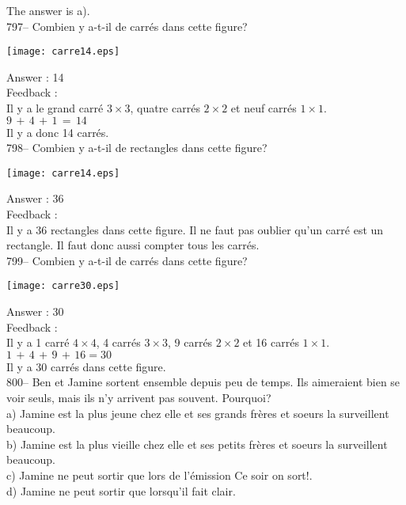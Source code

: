 ﻿\documentclass[letterpaper, 12pt]{article}
\begin{document}
The answer is a).\\

797-- Combien y a-t-il de carr\'es dans cette figure?\\
    \begin{center}
    \texttt{[image: carre14.eps]}
    \end{center}


Answer : 14\\

Feedback : \\
Il y a le grand carr\'e $3\times3$, quatre carr\'es $2\times2$ et neuf
carr\'es $1\times1$.\\
$9\,+\,4\,+\,1\,=\,14$\\
Il y a donc 14 carr\'es.\\

798-- Combien y a-t-il de rectangles dans cette figure?\\
    \begin{center}
    \texttt{[image: carre14.eps]}
    \end{center}

Answer : 36\\

Feedback : \\
Il y a 36 rectangles dans cette figure.  Il ne faut pas oublier qu'un
carr\'e est un rectangle.  Il faut donc aussi compter tous les carr\'es.  \\

799-- Combien y a-t-il de carr\'es dans cette figure?\\
    \begin{center}
    \texttt{[image: carre30.eps]}
    \end{center}

Answer : 30\\

Feedback : \\
Il y a 1 carr\'e $4\times4$, 4 carr\'es $3\times3$, 9 carr\'es
$2\times2$ et 16 carr\'es $1\times1$.\\
$1\,+\,4\,+\,9\,+\,16=30$\\
Il y a 30 carr\'es dans cette figure.\\

800-- Ben et Jamine sortent ensemble depuis peu de temps.  Ils aimeraient
bien se voir seuls, mais ils n'y arrivent pas souvent.  Pourquoi?\\
a) Jamine est la plus jeune chez elle et ses grands fr\`eres et soeurs la
surveillent beaucoup.\\
b) Jamine est la plus vieille chez elle et ses petits fr\`eres et soeurs la
surveillent beaucoup.\\
c) Jamine ne peut sortir que lors de l'\'emission \og Ce soir on sort!\fg .\\
d) Jamine ne peut sortir que lorsqu'il fait clair.\\
\end{document}
